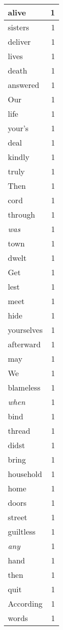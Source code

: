 \begin{center}
\begin{longtable}{l|r}
alive & 1 \\ \hline
sisters & 1 \\ \hline
deliver & 1 \\ \hline
lives & 1 \\ \hline
death & 1 \\ \hline
answered & 1 \\ \hline
Our & 1 \\ \hline
life & 1 \\ \hline
your's & 1 \\ \hline
deal & 1 \\ \hline
kindly & 1 \\ \hline
truly & 1 \\ \hline
Then & 1 \\ \hline
cord & 1 \\ \hline
through & 1 \\ \hline
\emph{was} & 1 \\ \hline
town & 1 \\ \hline
dwelt & 1 \\ \hline
Get & 1 \\ \hline
lest & 1 \\ \hline
meet & 1 \\ \hline
hide & 1 \\ \hline
yourselves & 1 \\ \hline
afterward & 1 \\ \hline
may & 1 \\ \hline
We & 1 \\ \hline
blameless & 1 \\ \hline
\emph{when} & 1 \\ \hline
bind & 1 \\ \hline
thread & 1 \\ \hline
didst & 1 \\ \hline
bring & 1 \\ \hline
household & 1 \\ \hline
home & 1 \\ \hline
doors & 1 \\ \hline
street & 1 \\ \hline
guiltless & 1 \\ \hline
\emph{any} & 1 \\ \hline
hand & 1 \\ \hline
then & 1 \\ \hline
quit & 1 \\ \hline
According & 1 \\ \hline
words & 1 \\ \hline

\end{longtable}
\end{center}
